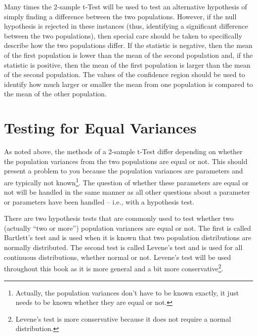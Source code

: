 \documentclass[10pt,openany]{book}\usepackage[]{graphicx}\usepackage[]{color}
\begin{document}
Many times the 2-sample t-Test will be used to test an alternative hypothesis of simply finding a difference between the two populations.  However, if the null hypothesis is rejected in these instances (thus, identifying a significant difference between the two populations), then special care should be taken to specifically describe how the two populations differ.  If the statistic is negative, then the mean of the first population is lower than the mean of the second population and, if the statistic is positive, then the mean of the first population is larger than the mean of the second population.  The values of the confidence region should be used to identify how much larger or smaller the mean from one population is compared to the mean of the other population.


\section{Testing for Equal Variances}
As noted above, the methods of a 2-sample t-Test differ depending on whether the population variances from the two populations are equal or not.  This should present a problem to you because the population variances are parameters and are typically not known\footnote{Actually, the population variances don't have to be known exactly, it just needs to be known whether they are equal or not.}.  The question of whether these parameters are equal or not will be handled in the same manner as all other questions about a parameter or parameters have been handled -- i.e., with a hypothesis test.


There are two hypothesis tests that are commonly used to test whether two (actually ``two or more'') population variances are equal or not.  The first is called Bartlett's test and is used when it is known that two population distributions are normally distributed.  The second test is called Levene's test and is used for all continuous distributions, whether normal or not.  Levene's test will be used throughout this book as it is more general and a bit more conservative\footnote{Levene's test is more conservative because it does not require a normal distribution.}.
\end{document}
